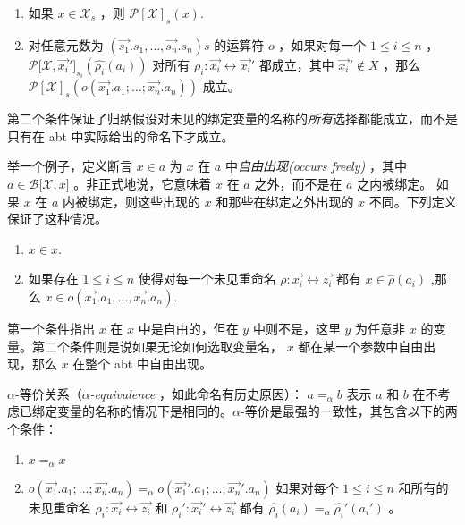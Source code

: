 \begin{enumerate}
\def\labelenumi{\arabic{enumi}.}
\item
  如果 \(x \in \mathcal{X}_s\) ，则 \(\mathcal{P[X]}_s(x)\).
\item
  对任意元数为 \((\vec{s_1}.s_1,\dots,\vec{s_n}.s_n)s\) 的运算符 \(o\)
  ，如果对每一个 \(1\leq i \leq n\) ，
  \(\mathcal{P[X},\vec{x_i}']_{s_i}(\hat{\rho_i}(a_i))\) 对所有
  \(\rho_i:\vec{x_i}\leftrightarrow \vec{x_i}'\) 都成立，其中
  \(\vec{x_i}' \notin X\) ，那么
  \(\mathcal{P[X]}_s(o(\vec{x_1}.a_1;\dots;\vec{x_n}.a_n))\) 成立。
\end{enumerate}

第二个条件保证了归纳假设对未见的绑定变量的名称的\emph{所有}选择都能成立，而不是只有在
abt 中实际给出的命名下才成立。

举一个例子，定义断言 \(x\in a\) 为 \(x\) 在 \(a\)
中\emph{自由出现(occurs freely)} ，其中 \(a\in \mathcal{B[X},x]\)
。非正式地说，它意味着 \(x\) 在 \(a\) 之外，而不是在 \(a\) 之内被绑定。
如果 \(x\) 在 \(a\) 内被绑定，则这些出现的 \(x\) 和那些在绑定之外出现的
\(x\) 不同。下列定义保证了这种情况。

\begin{enumerate}
\def\labelenumi{\arabic{enumi}.}
\item
  \(x\in x\).
\item
  如果存在 \(1\leq i \leq n\) 使得对每一个未见重命名
  \(\rho:\vec{x_i}\leftrightarrow \vec{z_i}\) 都有
  \(x\in \hat{\rho}(a_i)\) ,那么
  \(x \in o(\vec{x_1}.a_1,\dots,\vec{x_n}.a_n)\).
\end{enumerate}

第一个条件指出 \(x\) 在 \(x\) 中是自由的，但在 \(y\) 中则不是，这里
\(y\) 为任意非 \(x\) 的变量。第二个条件则是说如果无论如何选取变量名，
\(x\) 都在某一个参数中自由出现，那么 \(x\) 在整个 abt 中自由出现。

$\alpha$-等价关系（\emph{$\alpha$-equivalence} ，如此命名有历史原因）：
\(a=_\alpha b\) 表示 \(a\) 和 \(b\)
在不考虑已绑定变量的名称的情况下是相同的。$\alpha$-等价是最强的一致性，其包含以下的两个条件：

\begin{enumerate}
\def\labelenumi{\arabic{enumi}.}
\item
  \(x=_\alpha x\)
\item
  \(o(\vec{x_1}.a_1;\dots;\vec{x_n}.a_n) =_\alpha o(\vec{x_1}'.a_1;\dots;\vec{x_n}'.a_n)\)
  如果对每个 \( 1\leq i\leq n\) 和所有的未见重命名
  \(\rho_i:\vec{x_i}\leftrightarrow\vec{z_i}\) 和
  \(\rho_i':\vec{x_i}'\leftrightarrow\vec{z_i}\) 都有
  \(\hat{\rho_i}(a_i)=_\alpha\hat{\rho_i}'(a_i')\) 。
\end{enumerate}

